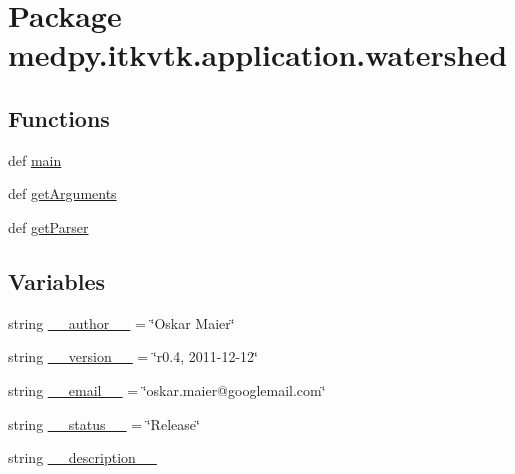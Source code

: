 \hypertarget{namespacemedpy_1_1itkvtk_1_1application_1_1watershed}{
\section{Package medpy.itkvtk.application.watershed}
\label{namespacemedpy_1_1itkvtk_1_1application_1_1watershed}
}
\subsection*{Functions}
\begin{DoxyCompactItemize}
\item 
def \hyperlink{namespacemedpy_1_1itkvtk_1_1application_1_1watershed_a9701033d83b40ed7f213fb971ea94f09}{main}
\item 
def \hyperlink{namespacemedpy_1_1itkvtk_1_1application_1_1watershed_af7bc02c9516d4595d2f6f7bd876eadc7}{getArguments}
\item 
def \hyperlink{namespacemedpy_1_1itkvtk_1_1application_1_1watershed_aea22c740d03e1a3329c3eb48b4d795c0}{getParser}
\end{DoxyCompactItemize}
\subsection*{Variables}
\begin{DoxyCompactItemize}
\item 
string \hyperlink{namespacemedpy_1_1itkvtk_1_1application_1_1watershed_a4c672a0843a1def3401038ef02138369}{\_\-\_\-author\_\-\_\-} = \char`\"{}Oskar Maier\char`\"{}
\item 
string \hyperlink{namespacemedpy_1_1itkvtk_1_1application_1_1watershed_a39da6aadd6bcf0711b328c7975ed27d7}{\_\-\_\-version\_\-\_\-} = \char`\"{}r0.4, 2011-\/12-\/12\char`\"{}
\item 
string \hyperlink{namespacemedpy_1_1itkvtk_1_1application_1_1watershed_a4cc460824fba5470e44794c2fb834474}{\_\-\_\-email\_\-\_\-} = \char`\"{}oskar.maier@googlemail.com\char`\"{}
\item 
string \hyperlink{namespacemedpy_1_1itkvtk_1_1application_1_1watershed_a47da6249d108e5519b54ffc9df02367e}{\_\-\_\-status\_\-\_\-} = \char`\"{}Release\char`\"{}
\item 
string \hyperlink{namespacemedpy_1_1itkvtk_1_1application_1_1watershed_a500aba0bc2b21d8d3c1bf4dcd2573254}{\_\-\_\-description\_\-\_\-}
\end{DoxyCompactItemize}



